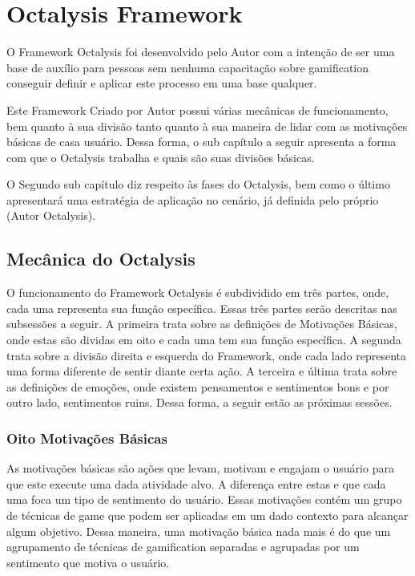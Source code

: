 \section{Octalysis Framework}
\label{sub:octalysisframework}
O Framework Octalysis foi desenvolvido pelo Autor com a intenção de ser uma
base de auxílio para pessoas sem nenhuma capacitação sobre gamification
conseguir definir e aplicar este processo em uma base qualquer.

Este Framework Criado por Autor possui várias mecânicas de funcionamento,
bem quanto à sua divisão tanto quanto à sua maneira de lidar com as
motivações básicas de casa usuário. Dessa forma, o sub capítulo a seguir
apresenta a forma com que o Octalysis trabalha e quais são suas divisões básicas.

O Segundo sub capítulo diz respeito às fases do Octalysis, bem como o último
apresentará uma estratégia de aplicação no cenário, já definida pelo próprio
(Autor Octalysis).


\subsection{Mecânica do Octalysis}
\label{sub:mecanicaoctalysis}
O funcionamento do Framework Octalysis é subdividido em três partes, onde,
cada uma representa sua função específica. Essas três partes serão descritas
nas subsessões a seguir. A primeira trata sobre as definições de Motivações
Básicas, onde estas são dividas em oito e cada uma tem sua função específica.
A segunda trata sobre a divisão direita e esquerda do Framework, onde cada
lado representa uma forma diferente de sentir diante certa ação.
A terceira e última trata sobre as definições de emoções, onde existem
pensamentos e sentimentos bons e por outro lado, sentimentos ruins.
Dessa forma, a seguir estão as próximas sessões.

\subsubsection{Oito Motivações Básicas}
\label{sub:oitomotivacoesbasicas}
As motivações básicas são ações que levam, motivam e engajam
o usuário para que este execute uma dada atividade alvo.
A diferença entre estas e que cada uma foca um tipo de sentimento
do usuário. Essas motivações contém um grupo de técnicas de game
que podem ser aplicadas em um dado contexto para alcançar algum
objetivo. Dessa maneira, uma motivação básica nada mais é do
que um agrupamento de técnicas de gamification separadas e agrupadas
por um sentimento que motiva o usuário.

